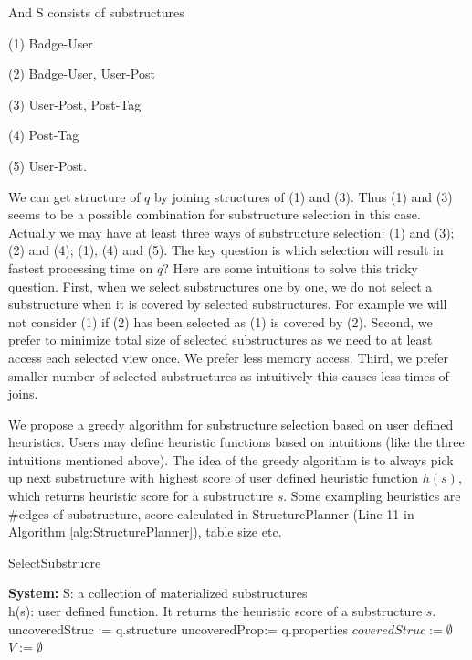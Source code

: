 And S consists of substructures

(1) Badge-User

(2) Badge-User, User-Post

(3) User-Post, Post-Tag

(4) Post-Tag

(5) User-Post.

We can get structure of $q$ by joining structures of (1) and (3). Thus (1) and (3) seems to be a possible combination for substructure selection in this case. Actually we may have at least three ways of substructure selection: (1) and (3); (2) and (4);
(1), (4) and (5). The key question is which selection will result in fastest processing time on $q$? Here are some intuitions to solve this tricky question. First, when we select substructures one by one, we do not select a substructure when it is covered by selected substructures. For example we will not consider (1) if (2) has been selected as (1) is covered by (2). Second, we prefer to minimize total size of selected substructures as we need to at least access each selected view once. We prefer less memory access. Third, we prefer smaller number of selected substructures as intuitively this causes less times of joins.

We propose a greedy algorithm for substructure selection based on user defined heuristics. Users may define heuristic functions based on intuitions (like the three intuitions mentioned above). The idea of the greedy algorithm is to always pick up next substructure with highest score of user defined heuristic function $h(s)$, which returns heuristic score for a substructure $s$. Some exampling heuristics are \#edges of substructure, score calculated in StructurePlanner (Line 11 in Algorithm \ref{alg:StructurePlanner}), table size etc.

\begin{algorithm}[H]
\caption{SelectSubstrucre}
\label{alg:SelectSubstrucre}
\LinesNumbered
\textbf{System:} S: a collection of materialized substructures\\ h(s): user defined function. It returns the heuristic score of a substructure $s$.\\
uncoveredStruc := q.structure\;
uncoveredProp:= q.properties\;
$coveredStruc:= \emptyset$\;
$V:=\emptyset $\;
\end{algorithm}


